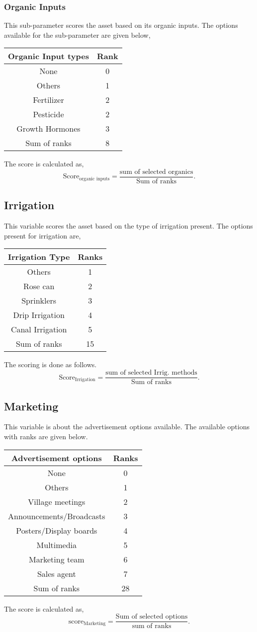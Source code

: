 \documentclass[oneside,twocolumn]{article}
\newcommand{\tsub}[2]{\text{#1}_{\text{#2}}}
\newenvironment{ttable}
               {\begin{center}
                   \begin{tabular}{c|c}
                     \hline
               }
               {\end{tabular}
                 \end{center}
               }
\begin{document}
\subsubsection{Organic Inputs}
This sub-parameter scores the asset based on its organic inputs. The options available for the sub-parameter are given below,
\begin{ttable}
  Organic Input types & Rank \\ \hline
  None & 0 \\
  Others & 1 \\
  Fertilizer & 2 \\
  Pesticide & 2 \\
  Growth Hormones & 3 \\ \hline
  Sum of ranks & 8 \\ \hline
\end{ttable}
The score is calculated as,
\[
\tsub{Score}{organic inputs} = \dfrac{\text{sum of selected organics}}{\text{Sum of ranks}}.
\]
\subsection{Irrigation}
This variable scores the asset based on the type of irrigation present. The options present for irrigation are,
\begin{ttable}
  Irrigation Type & Ranks \\ \hline
  Others & 1 \\
  Rose can & 2 \\
  Sprinklers & 3 \\
  Drip Irrigation & 4 \\
  Canal Irrigation & 5 \\ \hline
  Sum of ranks & 15 \\ \hline
\end{ttable}
The scoring is done as follows.
\[
\tsub{Score}{Irrigation} = \dfrac{\text{sum of selected Irrig. methods}}{\text{Sum of ranks}}.
\]
\subsection{Marketing}
This variable is about the advertisement options available. The available
options with ranks are given below.
\begin{center}
  \begin{tabular}{c|c}
    \hline
    Advertisement options & Ranks \\ \hline
    None & 0 \\
    Others & 1 \\
    Village meetings & 2 \\
    Announcements/Broadcasts & 3 \\
    Posters/Display boards & 4 \\
    Multimedia & 5 \\
    Marketing team & 6 \\
    Sales agent & 7 \\ \hline
    Sum of ranks & 28 \\ \hline
  \end{tabular}
\end{center}
The score is calculated as,
\[
\text{score}_{\text{Marketing}} = \dfrac{\text{Sum of selected options}}{\text{sum of ranks}}.
\]
\end{document}
